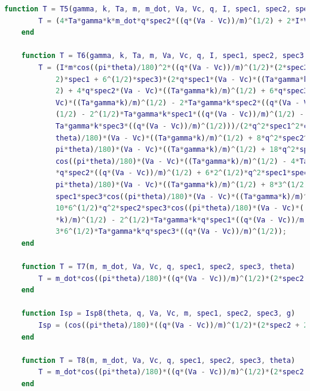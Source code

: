\documentclass[letterpaper, 10 pt, conference]{ieeeconf}  %
\begin{document}
\begin{lstlisting}[language=Matlab]
    function T = T5(gamma, k, Ta, m, m_dot, Va, Vc, q, I, spec1, spec2, spec3, theta)
        T = (4*Ta*gamma*k*m_dot*q*spec2*((q*(Va - Vc))/m)^(1/2) + 2*I*Va*m*q*spec1*cos((pi*theta)/180)*((Ta*gamma*k)/m)^(1/2) + 4*I*Va*m*q*spec2*cos((pi*theta)/180)*((Ta*gamma*k)/m)^(1/2) + 6*I*Va*m*q*spec3*cos((pi*theta)/180)*((Ta*gamma*k)/m)^(1/2) - 2*I*Vc*m*q*spec1*cos((pi*theta)/180)*((Ta*gamma*k)/m)^(1/2) - 4*I*Vc*m*q*spec2*cos((pi*theta)/180)*((Ta*gamma*k)/m)^(1/2) - 6*I*Vc*m*q*spec3*cos((pi*theta)/180)*((Ta*gamma*k)/m)^(1/2) + 2^(1/2)*Ta*gamma*k*m_dot*q*spec1*((q*(Va - Vc))/m)^(1/2) + 3*6^(1/2)*Ta*gamma*k*m_dot*q*spec3*((q*(Va - Vc))/m)^(1/2) - 2*I*Ta*gamma*k*m*spec2*cos((pi*theta)/180)*((q*(Va - Vc))/m)^(1/2) - 2^(1/2)*I*Ta*gamma*k*m*spec1*cos((pi*theta)/180)*((q*(Va - Vc))/m)^(1/2) - 6^(1/2)*I*Ta*gamma*k*m*spec3*cos((pi*theta)/180)*((q*(Va - Vc))/m)^(1/2))/(m*q*((q*(Va - Vc))/m)^(1/2)*(4*spec2 + 2^(1/2)*spec1 + 3*6^(1/2)*spec3)*((Ta*gamma*k)/m)^(1/2)); % N
    end
    
    function T = T6(gamma, k, Ta, m, Va, Vc, q, I, spec1, spec2, spec3, theta)
        T = (I*m*cos((pi*theta)/180)^2*((q*(Va - Vc))/m)^(1/2)*(2*spec2 + 2^(1/ ...
            2)*spec1 + 6^(1/2)*spec3)*(2*q*spec1*(Va - Vc)*((Ta*gamma*k)/m)^(1/ ...
            2) + 4*q*spec2*(Va - Vc)*((Ta*gamma*k)/m)^(1/2) + 6*q*spec3*(Va - ...
            Vc)*((Ta*gamma*k)/m)^(1/2) - 2*Ta*gamma*k*spec2*((q*(Va - Vc))/m)^ ...
            (1/2) - 2^(1/2)*Ta*gamma*k*spec1*((q*(Va - Vc))/m)^(1/2) - 6^(1/2)* ...
            Ta*gamma*k*spec3*((q*(Va - Vc))/m)^(1/2)))/(2*q^2*spec1^2*cos((pi* ...
            theta)/180)*(Va - Vc)*((Ta*gamma*k)/m)^(1/2) + 8*q^2*spec2^2*cos(( ...
            pi*theta)/180)*(Va - Vc)*((Ta*gamma*k)/m)^(1/2) + 18*q^2*spec3^2* ...
            cos((pi*theta)/180)*(Va - Vc)*((Ta*gamma*k)/m)^(1/2) - 4*Ta*gamma*k ...
            *q*spec2*((q*(Va - Vc))/m)^(1/2) + 6*2^(1/2)*q^2*spec1*spec2*cos(( ...
            pi*theta)/180)*(Va - Vc)*((Ta*gamma*k)/m)^(1/2) + 8*3^(1/2)*q^2* ...
            spec1*spec3*cos((pi*theta)/180)*(Va - Vc)*((Ta*gamma*k)/m)^(1/2) + ...
            10*6^(1/2)*q^2*spec2*spec3*cos((pi*theta)/180)*(Va - Vc)*((Ta*gamma ...
            *k)/m)^(1/2) - 2^(1/2)*Ta*gamma*k*q*spec1*((q*(Va - Vc))/m)^(1/2) - ...
            3*6^(1/2)*Ta*gamma*k*q*spec3*((q*(Va - Vc))/m)^(1/2));
    end
    
    function T = T7(m, m_dot, Va, Vc, q, spec1, spec2, spec3, theta)
        T = m_dot*cos((pi*theta)/180)*((q*(Va - Vc))/m)^(1/2)*(2*spec2 + 2^(1/2)*spec1 + 6^(1/2)*spec3); % N
    end
    
    function Isp = Isp8(theta, q, Va, Vc, m, spec1, spec2, spec3, g)
        Isp = (cos((pi*theta)/180)*((q*(Va - Vc))/m)^(1/2)*(2*spec2 + 2^(1/2)*spec1 + 6^(1/2)*spec3))/g;
    end
    
    function T = T8(m, m_dot, Va, Vc, q, spec1, spec2, spec3, theta)
        T = m_dot*cos((pi*theta)/180)*((q*(Va - Vc))/m)^(1/2)*(2*spec2 + 2^(1/2)*spec1 + 6^(1/2)*spec3); % N
    end
    
\end{lstlisting}
\end{document}
